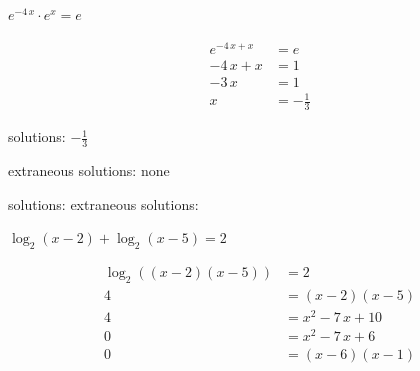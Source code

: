 \documentclass[addpoints]{exam}
\begin{document}
\begin{questions}
\newpage

\question[6] \label{exact-start}
\(\displaystyle{ e^{-4 \, x} \cdot e^{x} = e }\)
\begin{solution}
\[\begin{aligned} e^{-4 \, x+x} &= e \\ -4 \, x+x &= 1 \\ -3 \, x &= 1 \\ x &= -\frac{1}{3} \end{aligned}\]

solutions: \(\boxed{ -\frac{1}{3} }\)

extraneous solutions: \(\boxed{ \text{none} }\)
\end{solution}
\par solutions: \fillin\fillin {} extraneous solutions: \fillin\fillin

\question[6] 
\(\displaystyle{ \log_{2}(x - 2) + \log_{2}(x - 5) = 2 }\)
\begin{solution}
\[\begin{aligned} \log_{2}((x - 2)(x - 5)) &= 2 \\ 4 &= (x - 2)(x - 5) \\ 4 &= x^{2} - 7 \, x + 10 \\ 0 &= x^{2} - 7 \, x + 6 \\ 0 &= (x - 6)(x - 1) \end{aligned}\]


\end{solution}
\end{questions}
\end{document}
